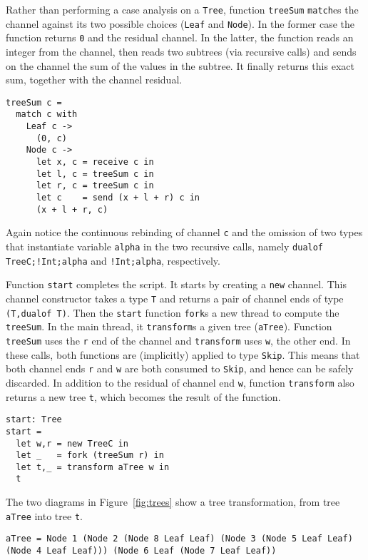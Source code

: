 Rather than performing a case analysis on a \lstinline|Tree|, function
\lstinline|treeSum| \lstinline|match|es the channel against its two
possible choices (\lstinline|Leaf| and \lstinline|Node|). In the
former case the function returns \lstinline|0| and the residual
channel. In the latter, the function reads an integer from the
channel, then reads two subtrees (via recursive calls) and sends on
the channel the sum of the values in the subtree. It finally returns
this exact sum, together with the channel residual.
%
\begin{lstlisting}
treeSum c =
  match c with
    Leaf c ->
      (0, c)
    Node c ->
      let x, c = receive c in
      let l, c = treeSum c in
      let r, c = treeSum c in
      let c    = send (x + l + r) c in
      (x + l + r, c)
\end{lstlisting}

Again notice the continuous rebinding of channel \lstinline|c| and the
omission of two types that instantiate variable \lstinline|alpha| in
the two recursive calls, namely \lstinline|dualof TreeC;!Int;alpha|
and \lstinline|!Int;alpha|, respectively.

Function \lstinline|start| completes the script. It starts by creating
a \lstinline|new| channel. This channel constructor takes a type
\lstinline|T| and returns a pair of channel ends of type
%
\lstinline|(T,dualof T)|. Then the \lstinline|start| function
\lstinline|fork|s a new thread to compute the \lstinline|treeSum|. In
the main thread, it \lstinline|transform|s a given tree
(\lstinline|aTree|). Function \lstinline|treeSum| uses the
\lstinline|r| end of the channel and \lstinline|transform| uses
\lstinline|w|, the other end. In these calls, both functions are
(implicitly) applied to type \lstinline|Skip|. This means that both
channel ends \lstinline|r| and \lstinline|w| are both consumed to
\lstinline|Skip|, and hence can be safely discarded. In addition to
the residual of channel end \lstinline|w|, function
\lstinline|transform| also returns a new tree \lstinline|t|, which
becomes the result of the function.
%
\begin{lstlisting}
start: Tree
start =
  let w,r = new TreeC in
  let _   = fork (treeSum r) in
  let t,_ = transform aTree w in
  t
\end{lstlisting}

The two diagrams in Figure~\ref{fig:trees} show a tree transformation, from tree
\lstinline|aTree| into tree \lstinline|t|.

\begin{lstlisting}
aTree = Node 1 (Node 2 (Node 8 Leaf Leaf) (Node 3 (Node 5 Leaf Leaf) (Node 4 Leaf Leaf))) (Node 6 Leaf (Node 7 Leaf Leaf))
\end{lstlisting}

